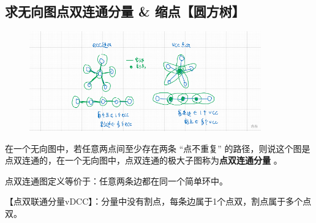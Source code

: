 \subsection{求无向图点双连通分量 \& 缩点【圆方树】}
\begin{figure}[H]
        \centering
        \par \includegraphics[width=10cm]{images/ecc.png}
\end{figure}
\par \noindent 在一个无向图中，若任意两点间至少存在两条 “点不重复” 的路径，则说这个图是点双连通的，在一个无向图中，点双连通的极大子图称为\textbf{点双连通分量} 。
~\\
\par \noindent 点双连通图定义等价于：任意两条边都在同一个简单环中。
~\\
\par \noindent 【点双联通分量vDCC】：分量中没有割点，每条边属于1个点双，割点属于多个点双。

